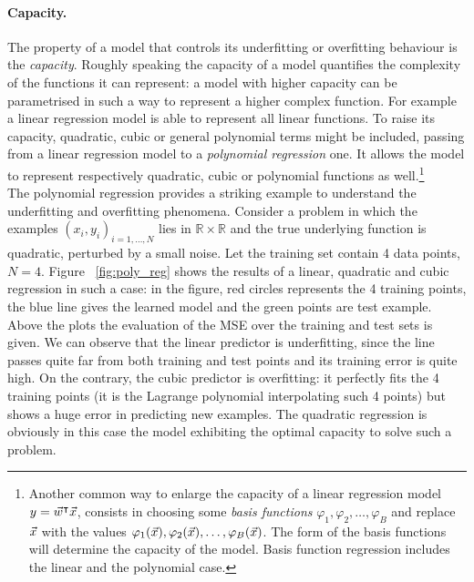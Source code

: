 \paragraph*{Capacity.}The property of a model that controls its underfitting or overfitting behaviour is the \emph{capacity}. Roughly speaking the capacity of a model quantifies the complexity of the functions it can represent: a model with higher capacity can be parametrised in such a way to represent a higher complex function. For example a linear regression model is able to represent all linear functions. To raise its capacity, quadratic, cubic or general polynomial terms might be included, passing from a linear regression model to a \emph{polynomial regression} one. It allows the model to represent respectively quadratic, cubic or polynomial functions as well.\footnote{Another common way to enlarge the capacity of a linear regression model $y = \vec{w}^\intercal \vec{x}$,  consists in choosing some \emph{basis functions} $\varphi_1, \varphi_2,\dots, \varphi_B$ and replace $\vec{x}$ with the values $\varphi_1(\vec{x}), \varphi_2(\vec{x}),\dots, \varphi_B(\vec{x})$. The form of the basis functions will determine the capacity of the model. Basis function regression includes the linear and the polynomial case.} \\

The polynomial regression provides a striking example to understand the underfitting and overfitting phenomena. Consider a problem in which the examples $(x_i,y_i)_{i=1,\dots,N}$ lies in $\mathbb{R} \times \mathbb{R}$ and the true underlying function is quadratic, perturbed by a small noise. Let the training set contain 4 data points, \ie $N=4$. Figure ~\ref{fig:poly_reg} shows the results of a linear, quadratic and cubic regression in such a case: in the figure, red circles represents the 4 training points, the blue line gives the learned model and the green points are test example. Above the plots the evaluation of the MSE over the training and test sets is given. We can observe that the linear predictor is underfitting, since the line passes quite far from both training and test points and its training error is quite high. On the contrary, the cubic predictor is overfitting: it perfectly fits the 4 training points (it is the Lagrange polynomial interpolating such 4 points) but shows a huge error in predicting new examples. The quadratic regression is obviously in this case the model exhibiting the optimal capacity to solve such a problem. \\

